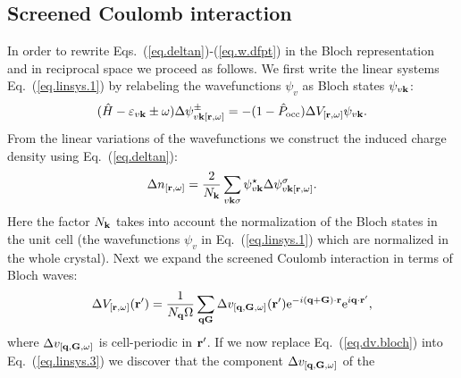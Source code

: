\documentclass[twocolumn,prb,showpacs,superscriptaddress]{revtex4}
\def\w{\omega}
\def\H{\hat{H}}
\def\P{\hat{P}_{\rm occ}}
\def\E{\varepsilon}
\def\q{{\bf q}}
\def\s{\sigma}
\def\k{{\bf k}}
\def\G{{\bf G}}
\def\Gp{{\bf G^\prime}}
\def\r{{\bf r}}
\def\rp{{\bf r^\prime}}
\begin{document}

%
%
%

\subsection{Screened Coulomb interaction}\label{sec.coulomb.g}

In order to rewrite Eqs.\ (\ref{eq.deltan})-(\ref{eq.w.dfpt}) in
the Bloch representation and in reciprocal space we proceed as follows.
We first write the linear systems Eq.\ (\ref{eq.linsys.1})
by relabeling the wavefunctions $\psi_v$ as Bloch states $\psi_{v\k}$:
  \begin{equation}\label{eq.linsys.3}
  (\H-\E_{v\k}\pm\w) \Delta \psi^\pm_{v\k[\r,\w]}  = -(1-\P)  \Delta V_{[\r,\w]} \psi_{v\k}.
  \end{equation}
From the linear variations of the wavefunctions we construct the
induced charge density using Eq.\ (\ref{eq.deltan}):
  \begin{equation}\label{eq.ch}
  \Delta n_{[\r,\w]} = \frac{2}{N_\k}\sum_{v\k\s} \psi_{v\k}^\star  \Delta \psi^\s_{v\k[\r,\w]}.
  \end{equation}
Here the factor $N_\k$ takes into account the normalization of
the Bloch states in the unit cell (the 
wavefunctions $\psi_v$ in Eq.\ (\ref{eq.linsys.1}) which are normalized 
in the whole crystal).
Next we expand the screened Coulomb interaction in terms
of Bloch waves: 
  \begin{equation}\label{eq.dv.bloch}
  \Delta V_{[\r,\w]} (\rp) = \frac{1}{N_\q\Omega}  \sum_{\q\G} \Delta v_{[\q,\G,\w]}(\rp) 
   {\rm e}^{-i(\q+\G)\cdot\r} {\rm e}^{i\q\cdot\rp}, 
  \end{equation}
where $\Delta v_{[\q,\G,\w]}$ is cell-periodic in $\rp$.
If we now replace Eq.\ (\ref{eq.dv.bloch}) into Eq.\ (\ref{eq.linsys.3})
we discover that the component $\Delta v_{[\q,\G,\w]}$ of the
\end{document}
